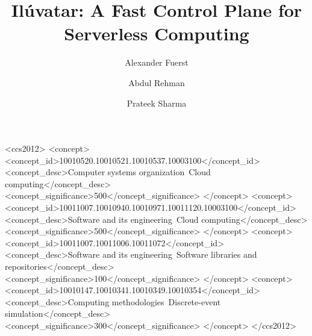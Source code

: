 \documentclass[sigconf]{acmart}
\newcommand{\sysname}{Il\'{u}vatar} %
\begin{document}
\date{}

\title{\sysname: A Fast Control Plane for Serverless Computing}

\author{Alexander Fuerst}

\author{Abdul Rehman}

\author{Prateek Sharma}

\begin{CCSXML}
  <ccs2012>
     <concept>
         <concept_id>10010520.10010521.10010537.10003100</concept_id>
         <concept_desc>Computer systems organization~Cloud computing</concept_desc>
         <concept_significance>500</concept_significance>
         </concept>
     <concept>
         <concept_id>10011007.10010940.10010971.10011120.10003100</concept_id>
         <concept_desc>Software and its engineering~Cloud computing</concept_desc>
         <concept_significance>500</concept_significance>
         </concept>
     <concept>
         <concept_id>10011007.10011006.10011072</concept_id>
         <concept_desc>Software and its engineering~Software libraries and repositories</concept_desc>
         <concept_significance>100</concept_significance>
         </concept>
     <concept>
         <concept_id>10010147.10010341.10010349.10010354</concept_id>
         <concept_desc>Computing methodologies~Discrete-event simulation</concept_desc>
         <concept_significance>300</concept_significance>
         </concept>
   </ccs2012>
\end{CCSXML}
  



\begin{abstract}
  
\end{abstract}
\end{document}

